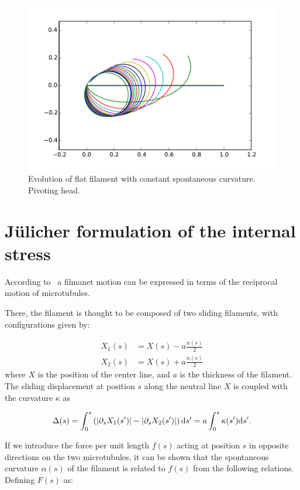 \begin{figure}
  \centering
  \includegraphics[width=\textwidth]{circle_pivoting}
  \caption{Evolution of flat filament with constant spontaneous
    curvature. Pivoting head.}
  \label{fig:circle-pivoting}
\end{figure}

\section{J\"ulicher formulation of the internal stress}

According to~\cite{CamaletJulicher2000} a filmanet motion can be expressed in terms of the reciprocal motion of microtubules.

There, the filament is thought to be composed of two sliding filaments, with configurations given by:

$$
\begin{aligned}
X_1(s) &= X(s)-a\frac{n(s)}{2} \\
X_2(s) &= X(s)+a\frac{n(s)}{2} 
\end{aligned}
$$
%
where $X$ is the position of the center line, and $a$ is the thickness of the filament. 
The sliding displacement at position $s$ along the neutral line $X$ is coupled with the curvature $\kappa$ as

$$
\Delta(s) = \int_0^s\left(|\partial_s X_1(s')|-|\partial_s
  X_2(s')|\right) \mathrm{d} s' = a\int_0^s \kappa(s') \mathrm{d} s'.
$$

If we introduce the force per unit length $f(s)$ acting at position
$s$ in opposite directions on the two microtubules, it can be shown
that the spontaneous curvature $\alpha(s)$ of the filament is related
to $f(s)$ from the following relations. Defining $F(s)$ as:

